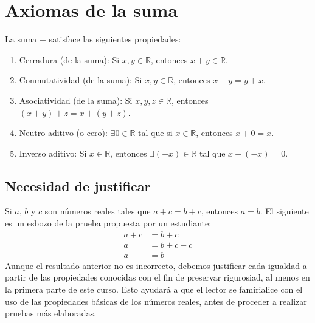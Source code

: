 \documentclass[11pt]{article}
\newcommand{\R}{\mathbb{R}}
\begin{document}
\section*{Axiomas de la suma}
La suma $+$ satisface las siguientes propiedades:
\begin{enumerate}%
    \item Cerradura (de la suma): Si $x,y\in \R$, entonces $x+y \in \R$.

    \item Conmutatividad (de la suma): Si $x, y\in \R$, entonces $x+y =y+x$.

    \item Asociatividad (de la suma): Si $x, y, z\in \R$, entonces $(x+y)+z = x+(y+z)$.
    \item Neutro aditivo (o cero): $\exists 0\in \R$ tal que si $x\in \R$, entonces $x+0=x$.
    \item Inverso aditivo: Si $x\in \R$, entonces $\exists (-x)\in \R$ tal que $x+(-x)=0$.
\end{enumerate}

\subsection*{Necesidad de justificar}

Si $a$, $b$ y $c$ son números reales tales que $a+c=b+c$, entonces $a=b$. El siguiente es un esbozo de la prueba propuesta por un estudiante: \begin{align*}
    a+c &= b+c\\
    a &= b+c-c\\
    a &= b \end{align*}
Aunque el resultado anterior no es incorrecto, debemos justificar cada igualdad a partir de las propiedades conocidas con el fin de preservar rigurosiad, al menos en la primera parte de este curso. Esto ayudará a que el lector se famirialice con el uso de las propiedades básicas de los números reales, antes de proceder a realizar pruebas más elaboradas.
\end{document}

